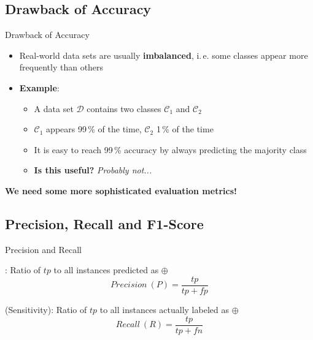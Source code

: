 \subsection{Drawback of Accuracy}

\begin{frame}{Drawback of Accuracy}{}
	\begin{itemize}
		\item Real-world data sets are usually \textbf{imbalanced}, i.\,e. some classes appear more frequently than others
		\item \textbf{Example}:
		\begin{itemize}
			\item A data set $\mathcal{D}$ contains two classes $\mathcal{C}_1$ and $\mathcal{C}_2$
			\item $\mathcal{C}_1$ appears 99\,\% of the time, $\mathcal{C}_2$ 1\,\% of the time
			\item It is easy to reach 99\,\% accuracy by always predicting the majority class
			\item \textbf{Is this useful?} \textit{Probably not...}
		\end{itemize}
	\end{itemize}
	
	\vspace*{-1mm}
	\begin{boxBlueNoFrame}
		\textbf{We need some more sophisticated evaluation metrics!}
	\end{boxBlueNoFrame}
\end{frame}


\subsection{Precision, Recall and F1-Score}

\begin{frame}{Precision and Recall}{}\important
	\begin{boxBlueNoFrame}
		: Ratio of $tp$ to all instances predicted as $\oplus$
		\begin{equation}
			Precision\ (P) = \frac{tp}{tp + fp}
		\end{equation}
	\end{boxBlueNoFrame}

	\begin{boxBlueNoFrame}
		 (Sensitivity): Ratio of $tp$ to all instances actually labeled as $\oplus$
		\begin{equation}
			Recall\ (R) = \frac{tp}{tp + fn}
		\end{equation}
	\end{boxBlueNoFrame}
\end{frame}


